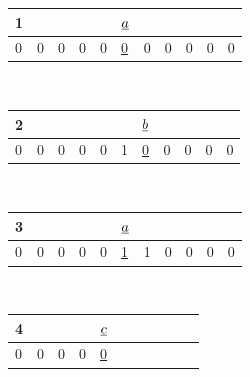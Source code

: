 \begin{table}[h!]
\begin{tabular}{lllllllllll}
1 &  &  &  &  & $\rva$ &  &  &  &  &  
\\ \hline
\multicolumn{1}{|l|}{\cellcolor[HTML]{FFFFC7}0} 
& \multicolumn{1}{l|}{0} 
& \multicolumn{1}{l|}{\cellcolor[HTML]{FFFFC7}0} 
& \multicolumn{1}{l|}{0} 
& \multicolumn{1}{l|}{\cellcolor[HTML]{FFFFC7}0} 
& \multicolumn{1}{l|}{\ul{0}} 
& \multicolumn{1}{l|}{\cellcolor[HTML]{FFFFC7}0} 
& \multicolumn{1}{l|}{0} 
& \multicolumn{1}{l|}{\cellcolor[HTML]{FFFFC7}0} 
& \multicolumn{1}{l|}{0} 
& \multicolumn{1}{l|}{\cellcolor[HTML]{FFFFC7}0} 
\\ \hline
\end{tabular}
\\
\begin{tabular}{lllllllllll}
2 &  &  &  &  &  & $\rvb$ &  &  &  &  
\\ \hline
\multicolumn{1}{|l|}{\cellcolor[HTML]{FFFFC7}0} 
& \multicolumn{1}{l|}{0} 
& \multicolumn{1}{l|}{\cellcolor[HTML]{FFFFC7}0} 
& \multicolumn{1}{l|}{0} 
& \multicolumn{1}{l|}{\cellcolor[HTML]{FFFFC7}0} 
& \multicolumn{1}{l|}{1} 
& \multicolumn{1}{l|}{\cellcolor[HTML]{FFFFC7}\ul{0}} 
& \multicolumn{1}{l|}{0} 
& \multicolumn{1}{l|}{\cellcolor[HTML]{FFFFC7}0} 
& \multicolumn{1}{l|}{0} 
& \multicolumn{1}{l|}{\cellcolor[HTML]{FFFFC7}0} 
\\ \hline
\end{tabular}
\\
\begin{tabular}{lllllllllll}
3 &  &  &  &  & $\rva$ &  &  &  &  &  
\\ \hline
\multicolumn{1}{|l|}{\cellcolor[HTML]{FFFFC7}0} 
& \multicolumn{1}{l|}{0} 
& \multicolumn{1}{l|}{\cellcolor[HTML]{FFFFC7}0} 
& \multicolumn{1}{l|}{0} 
& \multicolumn{1}{l|}{\cellcolor[HTML]{FFFFC7}0} 
& \multicolumn{1}{l|}{\ul{1}} 
& \multicolumn{1}{l|}{\cellcolor[HTML]{FFFFC7}1} 
& \multicolumn{1}{l|}{0} 
& \multicolumn{1}{l|}{\cellcolor[HTML]{FFFFC7}0} 
& \multicolumn{1}{l|}{0} 
& \multicolumn{1}{l|}{\cellcolor[HTML]{FFFFC7}0} 
\\ \hline
\end{tabular}
\\
\begin{tabular}{lllllllllll}
4 &  &  &  & $\rvc$ & &  &  &  &  &  
\\ \hline
\multicolumn{1}{|l|}{\cellcolor[HTML]{FFFFC7}0} 
& \multicolumn{1}{l|}{0} 
& \multicolumn{1}{l|}{\cellcolor[HTML]{FFFFC7}0} 
& \multicolumn{1}{l|}{0} 
& \multicolumn{1}{l|}{\cellcolor[HTML]{FFFFC7}\ul{0}} 

\end{tabular}
\end{table}
